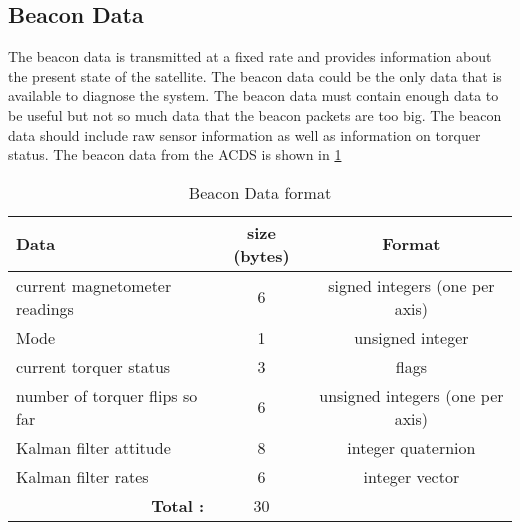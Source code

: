 \subsection{Beacon Data}

The beacon data is transmitted at a fixed rate and provides information about the present state of the satellite. The beacon data could be the only data that is available to diagnose the system. The beacon data must contain enough data to be useful but not so much data that the beacon packets are too big. The beacon data should include raw sensor information as well as information on torquer status. The beacon data from the \ac{ACDS} is shown in \cref{tab:beacondat}

\begin{table}[H]
    \centering
    \caption{Beacon Data format}
    \label{tab:beacondat}
    \begin{tabular}{|l|c|c|}
        \hline
        Data&size (bytes)&Format\\
        \hline
        current magnetometer readings&6&signed integers (one per axis)\\
        \hline
        Mode&1&unsigned integer\\
        \hline
        current torquer status&3&flags\\
        \hline
        number of torquer flips so far & 6 & unsigned integers (one per axis)\\
        \hline
        Kalman filter attitude&8&integer quaternion\\
        \hline
        Kalman filter rates&6&integer vector\\
        \hline
        \multicolumn{1}{|r|}{\bfseries Total :}&30&\\
        \hline
    \end{tabular}
\end{table}

